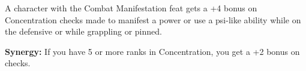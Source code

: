 A character with the Combat Manifestation feat gets a +4 bonus on Concentration checks made to manifest a power or use a psi-like ability while on the defensive or while grappling or pinned.

\textbf{Synergy:} If you have 5 or more ranks in Concentration, you get a +2 bonus on  checks.
